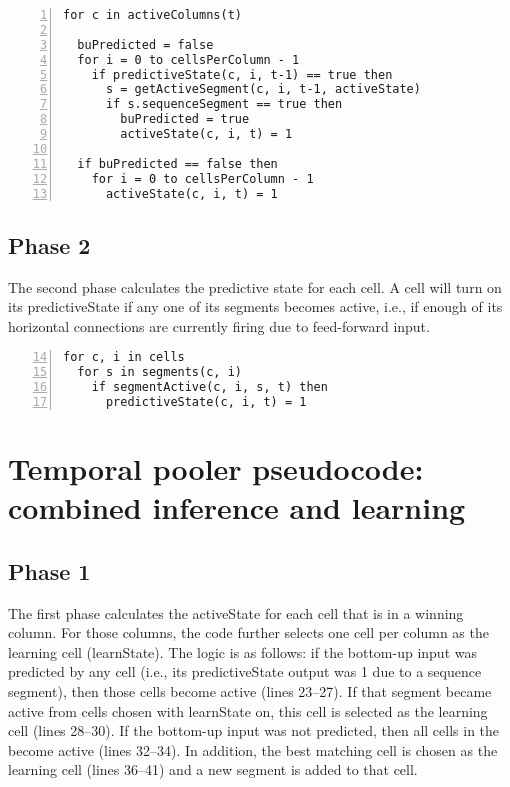 \begin{lstlisting}[numbers=left]
for c in activeColumns(t)

  buPredicted = false
  for i = 0 to cellsPerColumn - 1
    if predictiveState(c, i, t-1) == true then
      s = getActiveSegment(c, i, t-1, activeState)
      if s.sequenceSegment == true then
        buPredicted = true
        activeState(c, i, t) = 1

  if buPredicted == false then
    for i = 0 to cellsPerColumn - 1
      activeState(c, i, t) = 1
\end{lstlisting}

\subsection*{Phase 2}
The second phase calculates the predictive state for each cell. A cell
will turn on its predictiveState if any one of its segments becomes
active, i.e., if enough of its horizontal connections are currently
firing due to feed-forward input.

\begin{lstlisting}[numbers=left,firstnumber=14]
for c, i in cells
  for s in segments(c, i)
    if segmentActive(c, i, s, t) then
      predictiveState(c, i, t) = 1
\end{lstlisting}

\section*{Temporal pooler pseudocode: combined inference and learning}

\subsection*{Phase 1}

The first phase calculates the activeState for each cell that is in a
winning column. For those columns, the code further selects one cell
per column as the learning cell (learnState). The logic is as follows:
if the bottom-up input was predicted by any cell (i.e., its
predictiveState output was 1 due to a sequence segment), then those
cells become active (lines 23--27). If that segment became active from
cells chosen with learnState on, this cell is selected as the learning
cell (lines 28--30). If the bottom-up input was not predicted, then
all cells in the become active (lines 32--34). In addition, the best
matching cell is chosen as the learning cell (lines 36--41) and a new
segment is added to that cell.

